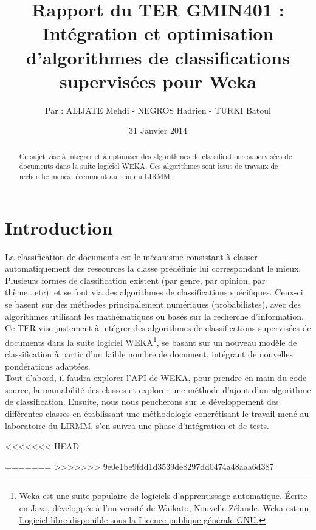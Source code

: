 \documentclass{article}
\title{Rapport du TER GMIN401 :\\ \textbf{Intégration et optimisation d’algorithmes de classifications supervisées pour Weka}}
\author{Par : ALIJATE Mehdi - NEGROS Hadrien - TURKI Batoul}
\date{31 Janvier 2014}
\begin{document}
\maketitle
\tableofcontents

\begin{abstract}
	
Ce sujet vise à intégrer et à optimiser des algorithmes de classifications supervisées de documents dans la suite logiciel WEKA. Ces algorithmes sont issus de travaux de recherche menés récemment au sein du LIRMM.
\end{abstract}

\newpage 
\section{Introduction}\label{sec:intro}
La classification de documents est le mécanisme consistant à classer automatiquement des ressources la classe prédéfinie lui correspondant le mieux.\\
Plusieurs formes de classification existent (par genre, par opinion, par thème...etc), et se font via des algorithmes de classifications spécifiques. Ceux-ci se basent sur des méthodes principalement numériques (probabilistes), avec des algorithmes utilisant les mathématiques ou basés sur la recherche d'information. \\
Ce TER vise justement à intégrer des algorithmes de classifications supervisées de documents dans la suite logiciel WEKA\footnote{\href{http://www.cs.waikato.ac.nz/~ml/weka/}{Weka est une suite populaire de logiciels d'apprentissage automatique. Écrite en Java, développée à l'université de Waikato, Nouvelle-Zélande. Weka est un Logiciel libre disponible sous la Licence publique générale GNU.}}, se basant sur un nouveau modèle de classification à partir d'un faible nombre de document, intégrant de nouvelles pondérations adaptées.\\
Tout d'abord, il faudra explorer l'API de WEKA, pour prendre en main du code source, la maniabilité des classes et explorer une méthode d'ajout d'un algorithme de classification. Ensuite, nous nous pencherons sur le développement des différentes classes en établissant une méthodologie concrétisant le travail mené au laboratoire du LIRMM, s'en suivra une phase d'intégration et de tests.

<<<<<<< HEAD


=======
>>>>>>> 9e0e1be9fdd1d3539de8297dd0474a48aaa6d387
\end{document}
